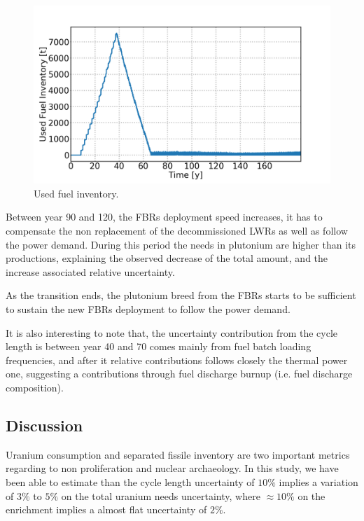\documentclass{anstrans}
\begin{document}
\begin{figure}[ht] %
    \centering
    \includegraphics[scale=0.18]{used_fuel}
    \caption{Used fuel inventory.}\label{fig:used_fuel}
\end{figure}
Between year 90 and 120, the \glspl{FBR} deployment speed increases, it has to
compensate the non replacement of the decommissioned \glspl{LWR} as well as
follow the power demand.  During this period the needs in plutonium are higher
than its productions, explaining the observed decrease of the total amount, and
the increase associated relative uncertainty.

As the transition ends, the plutonium breed from the \glspl{FBR} starts to be
sufficient to sustain the new \glspl{FBR} deployment to follow the power demand.

It is also interesting to note that, the uncertainty contribution from the cycle
length is between year 40 and 70 comes mainly from fuel batch loading
frequencies, and after it relative contributions follows closely the thermal
power one, suggesting a contributions through fuel discharge burnup (i.e. fuel
discharge composition).

\subsection{Discussion}

Uranium consumption and separated fissile inventory are two important metrics
regarding to non proliferation and nuclear archaeology. In this study, we have
been able to estimate than the cycle length uncertainty of $10\%$ implies a
variation of $3\%$ to $5\%$ on the total uranium needs uncertainty, where $\approx10\%$
on the enrichment implies a almost flat uncertainty of $2\%$.
\end{document}
